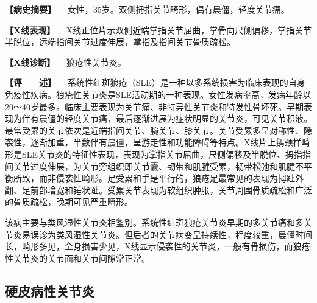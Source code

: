 \textbf{【病史摘要】}
　女性，35岁。双侧拇指关节畸形，偶有晨僵，轻度关节痛。

\textbf{【X线表现】}
　X线正位片示双侧近端掌指关节屈曲，掌骨向尺侧偏移，掌指关节半脱位，远端指间关节过度伸展，掌指及指间关节骨质疏松。

\textbf{【X线诊断】} 　狼疮性关节炎。

\textbf{【评　　述】}
　系统性红斑狼疮（SLE）是一种以多系统损害为临床表现的自身免疫性疾病。狼疮性关节炎是SLE活动期的一种表现。女性发病率高，发病年龄以20～40岁最多。临床主要表现为关节痛、非特异性关节炎和特发性骨坏死。早期表现为伴有晨僵的轻度关节痛，最后逐渐进展为症状明显的关节炎，可见关节积液。最常受累的关节依次是近端指间关节、腕关节、膝关节。关节受累多呈对称性、隐袭性，逐渐加重，半数伴有晨僵，呈游走性和功能障碍等特点。X线片上鹅颈样畸形是SLE关节炎的特征性表现，表现为掌指关节屈曲，尺侧偏移及半脱位、拇指指间关节过度伸展，为关节旁组织即关节囊、韧带和肌腱受累，韧带松弛和肌腱不平衡所致，而非侵袭性畸形。足受累和手是平行的，狼疮足最常见的表现为拇趾外翻、足前部增宽和锤状趾。受累关节表现为软组织肿胀，关节周围骨质疏松和广泛的骨质疏松，晚期可见严重畸形。

该病主要与类风湿性关节炎相鉴别。系统性红斑狼疮关节炎早期的多关节痛和多关节炎易误诊为类风湿性关节炎。但后者的关节病变呈持续性，程度较重，晨僵时间长，畸形多见，全身损害少见，X线显示侵袭性的关节炎，一般有骨损伤，而狼疮性关节炎的关节面和关节间隙常正常。

\subsection{硬皮病性关节炎}

